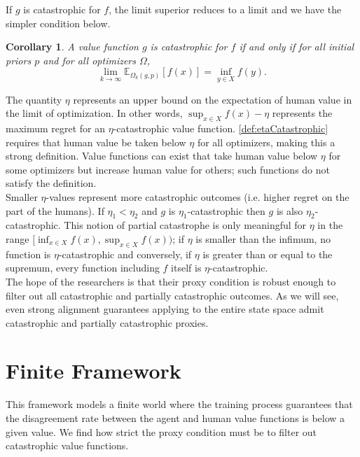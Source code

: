 \documentclass{article}
\newtheorem{Corollary}{Corollary}[section] \crefname{Corollary}{Corollary}{Corollaries}
\begin{document}
If $g$ is catastrophic for $f$, the limit superior reduces to a limit and we have the simpler condition below.

\begin{Corollary}\label{cor:catastrophicReducedDefinition}
A value function $g$ is catastrophic for $f$ if and only if for all initial priors $p$ and for all optimizers $\Omega$,
$$\lim_{k \rightarrow \infty} \mathbb E_{\Omega_k(g,p)}[f(x)] = \inf_{y \in X} f(y).$$
\end{Corollary}

The quantity $\eta$ represents an upper bound on the expectation of human value in the limit of optimization. In other words, $\sup_{x \in X} f(x) - \eta$ represents the maximum regret for an $\eta$-catastrophic value function. \cref{def:etaCatastrophic} requires that human value be taken below $\eta$ for all optimizers, making this a strong definition. Value functions can exist that take human value below $\eta$ for some optimizers but increase human value for others; such functions do not satisfy the definition.\\

Smaller $\eta$-values represent more catastrophic outcomes (i.e. higher regret on the part of the humans). If $\eta_1 < \eta_2$ and $g$ is $\eta_1$-catastrophic then $g$ is also $\eta_2$-catastrophic. This notion of partial catastrophe is only meaningful for $\eta$ in the range $[\inf_{x \in X} f(x), \sup_{x \in X} f(x))$; if $\eta$ is smaller than the infimum, no function is $\eta$-catastrophic and conversely, if $\eta$ is greater than or equal to the supremum, every function including $f$ itself is $\eta$-catastrophic.\\

The hope of the researchers is that their proxy condition is robust enough to filter out all catastrophic and partially catastrophic outcomes. As we will see, even strong alignment guarantees applying to the entire state space admit catastrophic and partially catastrophic proxies.

\section{Finite Framework} \label{sec:finiteFramework}
This framework models a finite world where the training process guarantees that the disagreement rate between the agent and human value functions is below a given value. We find how strict the proxy condition must be to filter out catastrophic value functions.
\end{document}
